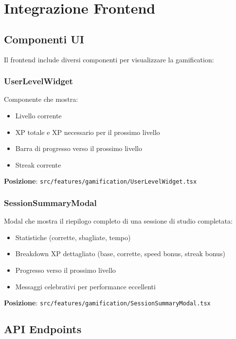 \documentclass[11pt,a4paper]{article}
\begin{document}
\section{Integrazione Frontend}

\subsection{Componenti UI}

Il frontend include diversi componenti per visualizzare la gamification:

\subsubsection{UserLevelWidget}

Componente che mostra:
\begin{itemize}
    \item Livello corrente
    \item XP totale e XP necessario per il prossimo livello
    \item Barra di progresso verso il prossimo livello
    \item Streak corrente
\end{itemize}

\textbf{Posizione}: \texttt{src/features/gamification/UserLevelWidget.tsx}

\subsubsection{SessionSummaryModal}

Modal che mostra il riepilogo completo di una sessione di studio completata:
\begin{itemize}
    \item Statistiche (corrette, sbagliate, tempo)
    \item Breakdown XP dettagliato (base, corrette, speed bonus, streak bonus)
    \item Progresso verso il prossimo livello
    \item Messaggi celebrativi per performance eccellenti
\end{itemize}

\textbf{Posizione}: \texttt{src/features/gamification/SessionSummaryModal.tsx}

\subsection{API Endpoints}
\end{document}
